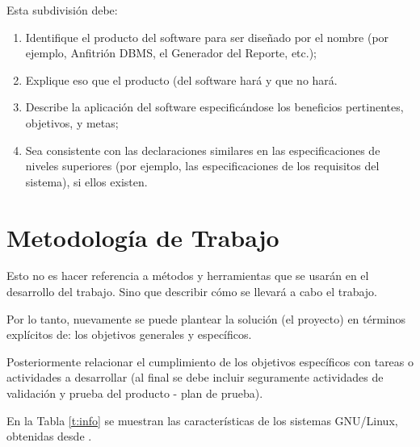 \documentclass[letter,12pt]{report}
\begin{document}
Esta subdivisión debe:
\begin{enumerate}\justifying
  \item Identifique el producto del software para ser diseñado por el nombre (por ejemplo, Anfitrión DBMS, el Generador del Reporte, etc.);
  \item Explique eso que el producto (del software hará y que no hará.
  \item Describe la aplicación del software especificándose los beneficios pertinentes, objetivos, y metas;
  \item Sea consistente con las declaraciones similares en las especificaciones de niveles superiores (por ejemplo, las especificaciones de los requisitos del sistema), si ellos existen.
\end{enumerate}




\section{Metodología de Trabajo}
Esto no es hacer referencia a métodos y herramientas que se usarán en el desarrollo del trabajo. Sino que describir cómo se llevará a cabo el trabajo.

Por lo tanto, nuevamente se puede plantear la solución (el proyecto) en términos explícitos de: los objetivos generales y específicos.

Posteriormente relacionar el cumplimiento de los objetivos específicos con tareas o actividades a desarrollar (al final se debe incluir seguramente actividades de validación y prueba del producto - plan de prueba).



En la Tabla \ref{t:info} se muestran las características de los sistemas GNU/Linux, obtenidas desde \cite{001}.
\end{document}

